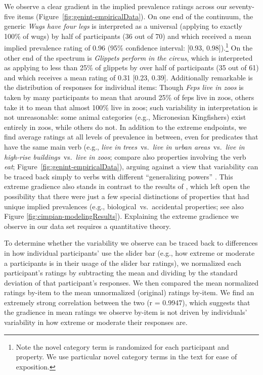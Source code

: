 \documentclass[floatsintext,man]{apa6}
\let\rmarkdownfootnote\footnote%
\def\footnote{\protect\rmarkdownfootnote}
\newcommand{\ndg}[1]{{\textcolor{Green}{[ndg: #1]}}}
\begin{document}
We observe a clear gradient in the implied prevalence ratings across our seventy-five items (Figure~\ref{fig:genint-empiricalData}).
On one end of the continuum, the generic \emph{Wugs have four legs} is interpreted as a universal (applying to exactly 100\% of wugs) by half of participants (36 out of 70) and which received a mean implied prevalence rating of 0.96 (95\% confidence interval: [0.93, 0.98]).\footnote{Note the novel category term is randomized for each participant and property. We use particular novel category terms in the text for ease of exposition.}
On the other end of the spectrum is \emph{Glippets perform in the circus}, which is interpreted as applying to less than 25\% of glippets by over half of participants (35 out of 61) and which receives a mean rating of 0.31 [0.23, 0.39].
Additionally remarkable is the distribution of responses for individual items: Though \emph{Feps live in zoos} is taken by many participants to mean that around 25\% of feps live in zoos, others take it to mean that almost 100\% live in zoos; such variability in interpretation is not unreasonable: some animal categories (e.g., Micronesian Kingfishers) exist entirely in zoos, while others do not.
In addition to the extreme endpoints, we find average ratings at all levels of prevalence in between, even for predicates that have the same main verb (e.g., \emph{live in} \emph{trees}~vs.~\emph{live in urban areas}~vs.~\emph{live in high-rise buildings}~vs.~\emph{live in zoos}; compare also properties involving the verb \emph{eat}; Figure~\ref{fig:genint-empiricalData}), arguing against a view that variability can be traced back simply to verbs with different ``generalizing powers'' \cite{Abelson1966, Cimpian2010}.
This extreme gradience also stands in contrast to the results of , which left open the possibility that there were just a few special distinctions of properties that had unique implied prevalences (e.g., biological~vs.~accidental properties; see also Figure \ref{fig:cimpian-modelingResults}). 
Explaining the extreme gradience we observe in our data set requires a quantitative theory. 


To determine whether the variability we observe can be traced back to differences in how individual participants' use the slider bar (e.g., how extreme or moderate a participants is in their usage of the slider bar ratings), we normalized each participant's ratings by subtracting the mean and dividing by the standard deviation of that participant's responses. We then compared the mean normalized ratings by-item to the mean unnormalized (original) ratings by-item. We find an extremely strong correlation between the two (r = 0.9947), which suggests that the gradience in mean ratings we observe by-item is not driven by individuals’ variability in how extreme or moderate their responses are.
\end{document}
